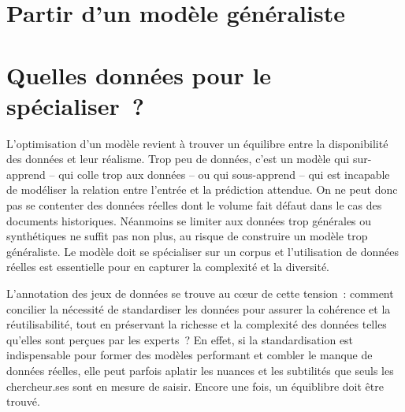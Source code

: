         \hypertarget{partir-modele-generaliste}{%
        \section{Partir d'un modèle
        généraliste}\label{partir-modele-generaliste}}
        
        
        
        \hypertarget{quelles-donnees}{%
        \section{Quelles données pour le spécialiser~?}\label{quelles-donnuees}}
        
        

\vspace{2cm}

L'optimisation d'un modèle revient à trouver un équilibre entre la
disponibilité des données et leur réalisme. Trop peu de données, c'est
un modèle qui sur-apprend -- qui colle trop aux données -- ou qui
sous-apprend -- qui est incapable de modéliser la relation entre
l'entrée et la prédiction attendue. On ne peut donc pas se contenter des
données réelles dont le volume fait défaut dans le cas des documents
historiques. Néanmoins se limiter aux données trop générales ou
synthétiques ne suffit pas non plus, au risque de construire un modèle
trop généraliste. Le modèle doit se spécialiser sur un corpus et
l'utilisation de données réelles est essentielle pour en capturer la
complexité et la diversité.

L'annotation des jeux de données se trouve au cœur de cette tension~:
comment concilier la nécessité de standardiser les données pour assurer
la cohérence et la réutilisabilité, tout en préservant la richesse et la
complexité des données telles qu'elles sont perçues par les experts~? En
effet, si la standardisation est indispensable pour former des modèles
performant et combler le manque de données réelles, elle peut parfois
aplatir les nuances et les subtilités que seuls les chercheur.ses sont en
mesure de saisir. Encore une fois, un équiblibre doit être trouvé.